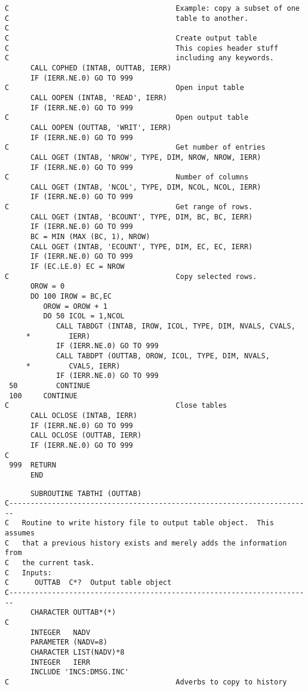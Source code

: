 {{\begin{verbatim}
C                                       Example: copy a subset of one
C                                       table to another.
C
C                                       Create output table
C                                       This copies header stuff
C                                       including any keywords.
      CALL COPHED (INTAB, OUTTAB, IERR)
      IF (IERR.NE.0) GO TO 999
C                                       Open input table
      CALL OOPEN (INTAB, 'READ', IERR)
      IF (IERR.NE.0) GO TO 999
C                                       Open output table
      CALL OOPEN (OUTTAB, 'WRIT', IERR)
      IF (IERR.NE.0) GO TO 999
C                                       Get number of entries
      CALL OGET (INTAB, 'NROW', TYPE, DIM, NROW, NROW, IERR)
      IF (IERR.NE.0) GO TO 999
C                                       Number of columns
      CALL OGET (INTAB, 'NCOL', TYPE, DIM, NCOL, NCOL, IERR)
      IF (IERR.NE.0) GO TO 999
C                                       Get range of rows.
      CALL OGET (INTAB, 'BCOUNT', TYPE, DIM, BC, BC, IERR)
      IF (IERR.NE.0) GO TO 999
      BC = MIN (MAX (BC, 1), NROW)
      CALL OGET (INTAB, 'ECOUNT', TYPE, DIM, EC, EC, IERR)
      IF (IERR.NE.0) GO TO 999
      IF (EC.LE.0) EC = NROW
C                                       Copy selected rows.
      OROW = 0
      DO 100 IROW = BC,EC
         OROW = OROW + 1
         DO 50 ICOL = 1,NCOL
            CALL TABDGT (INTAB, IROW, ICOL, TYPE, DIM, NVALS, CVALS,
     *         IERR)
            IF (IERR.NE.0) GO TO 999
            CALL TABDPT (OUTTAB, OROW, ICOL, TYPE, DIM, NVALS,
     *         CVALS, IERR)
            IF (IERR.NE.0) GO TO 999
 50         CONTINUE
 100     CONTINUE
C                                       Close tables
      CALL OCLOSE (INTAB, IERR)
      IF (IERR.NE.0) GO TO 999
      CALL OCLOSE (OUTTAB, IERR)
      IF (IERR.NE.0) GO TO 999
C
 999  RETURN
      END
\end{verbatim}
\begin{verbatim}
      SUBROUTINE TABTHI (OUTTAB)
C-----------------------------------------------------------------------
C   Routine to write history file to output table object.  This assumes
C   that a previous history exists and merely adds the information from
C   the current task.
C   Inputs:
C      OUTTAB  C*?  Output table object
C-----------------------------------------------------------------------
      CHARACTER OUTTAB*(*)
C
      INTEGER   NADV
      PARAMETER (NADV=8)
      CHARACTER LIST(NADV)*8
      INTEGER   IERR
      INCLUDE 'INCS:DMSG.INC'
C                                       Adverbs to copy to history

\end{verbatim}}}
